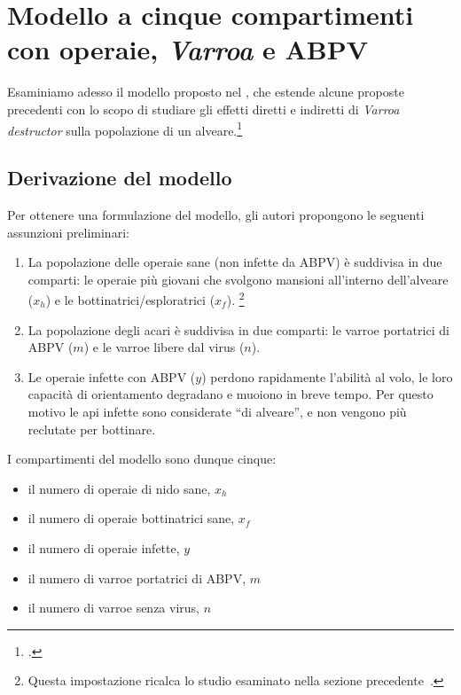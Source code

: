 \section{Modello a cinque compartimenti con operaie, \emph{Varroa} e ABPV}
\label{sec:ratti17}
Esaminiamo adesso il modello proposto nel \citeyear{ratti2017}, che estende alcune proposte precedenti con lo scopo di studiare gli effetti diretti e indiretti di \emph{Varroa destructor} sulla popolazione
di un alveare.\footcite{ratti2017}

\subsection{Derivazione del modello}
Per ottenere una formulazione del modello, gli autori propongono le seguenti assunzioni preliminari:
\begin{enumerate}
    \item La popolazione delle operaie sane (non infette da ABPV) è suddivisa in due comparti: le operaie più giovani che svolgono mansioni all'interno dell'alveare ($x_h$) e le bottinatrici/esploratrici ($x_f$).
    \footnote{Questa impostazione ricalca lo studio esaminato nella sezione
    precedente~\parencite{khoury2011}.}
    \item La popolazione degli acari è suddivisa in due comparti: le varroe portatrici di ABPV ($m$) e le varroe libere dal virus ($n$).
    \item Le operaie infette con ABPV ($y$) perdono rapidamente l'abilità al volo, le loro capacità di
    orientamento degradano e muoiono in breve tempo. Per questo motivo le api infette sono considerate
    ``di alveare'', e non vengono più reclutate per bottinare.
\end{enumerate}

I compartimenti del modello sono dunque cinque:
\begin{itemize}
    \item il numero di operaie di nido sane, $x_h$
    \item il numero di operaie bottinatrici sane, $x_f$
    \item il numero di operaie infette, $y$
    \item il numero di varroe portatrici di ABPV, $m$
    \item il numero di varroe senza virus, $n$
\end{itemize}

